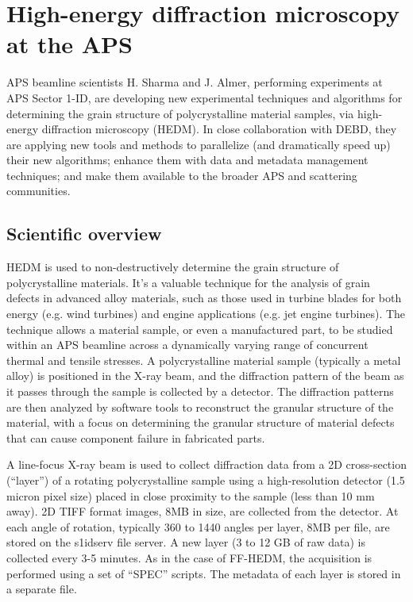 \documentclass[conference,10pt]{IEEEtran}
\begin{document}
\section{High-energy diffraction microscopy at the APS}

APS beamline scientists H. Sharma and J. Almer, performing experiments
at APS Sector 1-ID, are developing new experimental techniques and
algorithms for determining the grain structure of polycrystalline
material samples, via high-energy diffraction microscopy (HEDM).  In
close collaboration with DEBD, they are applying new tools and methods
to parallelize (and dramatically speed up) their new algorithms;
enhance them with data and metadata management techniques; and make
them available to the broader APS and scattering communities.

\subsection{Scientific overview}

HEDM is used to non-destructively determine the grain structure of
polycrystalline materials. It's a valuable technique for the analysis of
grain defects in advanced alloy materials, such as those used in
turbine blades for both energy (e.g. wind turbines) and engine
applications (e.g. jet engine turbines). The technique allows a
material sample, or even a manufactured part, to be studied within an
APS beamline across a dynamically varying range of concurrent thermal
and tensile stresses.  A polycrystalline material sample (typically a
metal alloy) is positioned in the X-ray beam, and the diffraction
pattern of the beam as it passes through the sample is collected by a
detector.  The diffraction patterns are then analyzed by software
tools to reconstruct the granular structure of the material, with a
focus on determining the granular structure of material defects that
can cause component failure in fabricated parts.

A line-focus X-ray beam is used to collect diffraction data from
a 2D cross-section (``layer'') of a rotating polycrystalline sample
using a high-resolution detector (1.5 micron pixel size) placed in close
proximity to the sample (less than 10 mm away). 2D TIFF format images, 8MB in
size, are collected from the detector. At each angle of rotation,
typically 360 to 1440 angles per layer, 8MB per file, are stored on
the s1idserv file server. A new layer (3 to 12 GB of raw data) is
collected every 3-5 minutes. As in the case of FF-HEDM, the
acquisition is performed using a set of ``SPEC'' scripts. The metadata
of each layer is stored in a separate file.
\end{document}
